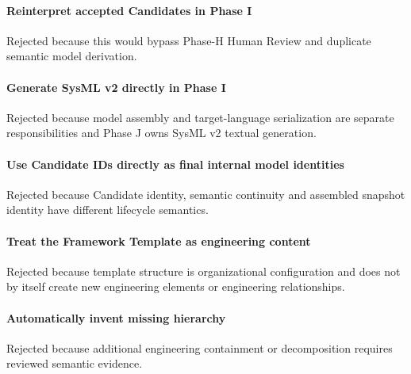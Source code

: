 \hypertarget{reinterpret-accepted-candidates-in-phase-i}{%
\paragraph{Reinterpret accepted Candidates in Phase I}\label{reinterpret-accepted-candidates-in-phase-i}}

Rejected because this would bypass Phase-H Human Review and duplicate semantic model derivation.

\hypertarget{generate-sysml-v2-directly-in-phase-i}{%
\paragraph{Generate SysML v2 directly in Phase I}\label{generate-sysml-v2-directly-in-phase-i}}

Rejected because model assembly and target-language serialization are separate responsibilities and Phase J owns SysML v2 textual generation.

\hypertarget{use-candidate-ids-directly-as-final-internal-model-identities}{%
\paragraph{Use Candidate IDs directly as final internal model identities}\label{use-candidate-ids-directly-as-final-internal-model-identities}}

Rejected because Candidate identity, semantic continuity and assembled snapshot identity have different lifecycle semantics.

\hypertarget{treat-the-framework-template-as-engineering-content}{%
\paragraph{Treat the Framework Template as engineering content}\label{treat-the-framework-template-as-engineering-content}}

Rejected because template structure is organizational configuration and does not by itself create new engineering elements or engineering relationships.

\hypertarget{automatically-invent-missing-hierarchy}{%
\paragraph{Automatically invent missing hierarchy}\label{automatically-invent-missing-hierarchy}}

Rejected because additional engineering containment or decomposition requires reviewed semantic evidence.

